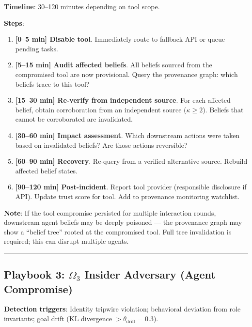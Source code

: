 \documentclass[
]{article}
\providecommand{\tightlist}{%
  \setlength{\itemsep}{0pt}\setlength{\parskip}{0pt}}
\begin{document}
\textbf{Timeline}: 30--120 minutes depending on tool scope.

\textbf{Steps}:

\begin{enumerate}
\def\labelenumi{\arabic{enumi}.}
\tightlist
\item
  \textbf{{[}0--5 min{]} Disable tool}. Immediately route to fallback
  API or queue pending tasks.
\item
  \textbf{{[}5--15 min{]} Audit affected beliefs}. All beliefs sourced
  from the compromised tool are now provisional. Query the provenance
  graph: which beliefs trace to this tool?
\item
  \textbf{{[}15--30 min{]} Re-verify from independent source}. For each
  affected belief, obtain corroboration from an independent source
  (\(\kappa \geq 2\)). Beliefs that cannot be corroborated are
  invalidated.
\item
  \textbf{{[}30--60 min{]} Impact assessment}. Which downstream actions
  were taken based on invalidated beliefs? Are those actions reversible?
\item
  \textbf{{[}60--90 min{]} Recovery}. Re-query from a verified
  alternative source. Rebuild affected belief states.
\item
  \textbf{{[}90--120 min{]} Post-incident}. Report tool provider
  (responsible disclosure if API). Update trust score for tool. Add to
  provenance monitoring watchlist.
\end{enumerate}

\textbf{Note}: If the tool compromise persisted for multiple interaction
rounds, downstream agent beliefs may be deeply poisoned --- the
provenance graph may show a ``belief tree'' rooted at the compromised
tool. Full tree invalidation is required; this can disrupt multiple
agents.

\begin{center}\rule{0.5\linewidth}{0.5pt}\end{center}

\subsection{\texorpdfstring{Playbook 3: \(\Omega_3\) Insider Adversary
(Agent
Compromise)}{Playbook 3: Omega_3 Insider Adversary (Agent Compromise)}}\label{playbook-3-omega_3-insider-adversary-agent-compromise}

\textbf{Detection triggers}: Identity tripwire violation; behavioral
deviation from role invariants; goal drift (KL divergence
\(> \theta_{\text{drift}} = 0.3\)).
\end{document}
